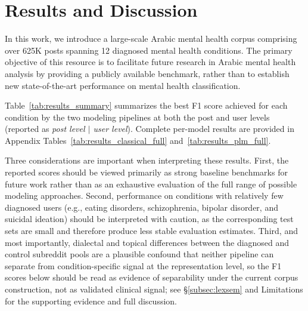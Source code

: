 \documentclass[11pt]{article}
\begin{document}
\section{Results and Discussion}
\label{sec:results}
In this work, we introduce a large-scale Arabic mental health corpus comprising over 625K posts spanning 12 diagnosed mental health conditions. The primary objective of this resource is to facilitate future research in Arabic mental health analysis by providing a publicly available benchmark, rather than to establish new state-of-the-art performance on mental health classification.

Table~\ref{tab:results_summary} summarizes the best F1 score achieved for each condition by the two modeling pipelines at both the post and user levels (reported as \textit{post level $|$ user level}). Complete per-model results are provided in Appendix Tables~\ref{tab:results_classical_full} and~\ref{tab:results_plm_full}.

Three considerations are important when interpreting these results. First, the reported scores should be viewed primarily as strong baseline benchmarks for future work rather than as an exhaustive evaluation of the full range of possible modeling approaches. Second, performance on conditions with relatively few diagnosed users (e.g., eating disorders, schizophrenia, bipolar disorder, and suicidal ideation) should be interpreted with caution, as the corresponding test sets are small and therefore produce less stable evaluation estimates. Third, and most importantly, dialectal and topical differences between the diagnosed and control subreddit pools are a plausible confound that neither pipeline can separate from condition-specific signal at the representation level, so the F1 scores below should be read as evidence of separability under the current corpus construction, not as validated clinical signal; see §\ref{subsec:lexsem} and Limitations for the supporting evidence and full discussion.
\end{document}
